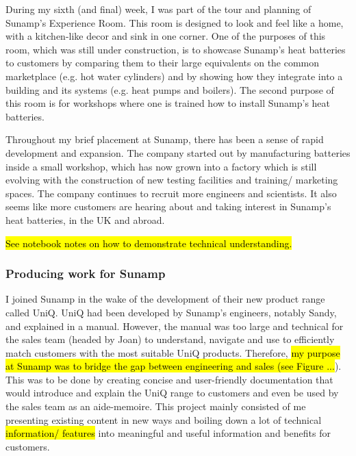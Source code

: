 During my sixth (and final) week, I was part of the tour and planning of Sunamp's Experience Room.
This room is designed to look and feel like a home, with a kitchen-like decor and sink in one corner.
One of the purposes of this room, which was still under construction, is to showcase Sunamp's heat batteries to customers by comparing them to their large equivalents on the common marketplace (e.g. hot water cylinders) and by showing how they integrate into a building and its systems (e.g. heat pumps
and boilers).
The second purpose of this room is for workshops where one is trained how to install Sunamp's heat batteries.

Throughout my brief placement at Sunamp, there has been a sense of rapid development and expansion.
The company started out by manufacturing batteries inside a small workshop, which has now grown into a factory which is still evolving with the construction of new testing facilities and training/ marketing spaces.
The company continues to recruit more engineers and scientists.
It also seems like more customers are hearing about and taking interest in Sunamp's heat batteries, in the UK and abroad.

\hl{See notebook notes on how to demonstrate technical understanding.}



\subsubsection{Producing work for Sunamp} \label{sec:sunamp_work}


I joined Sunamp in the wake of the development of their new product range called UniQ.
UniQ had been developed by Sunamp's engineers, notably Sandy, and explained in a manual.
However, the manual was too large and technical for the sales team (headed by Joan) to understand, navigate and use to efficiently match customers with the most suitable UniQ products.
Therefore, \hl{my purpose at Sunamp was to bridge the gap between engineering and sales (see Figure ...}).
This was to be done by creating concise and user-friendly documentation that would introduce and explain the UniQ range to customers and even be used by the sales team as an aide-memoire.
This project mainly consisted of me presenting existing content in new ways and boiling down a lot of technical \hl{information/ features} into meaningful and useful information and benefits for customers.

